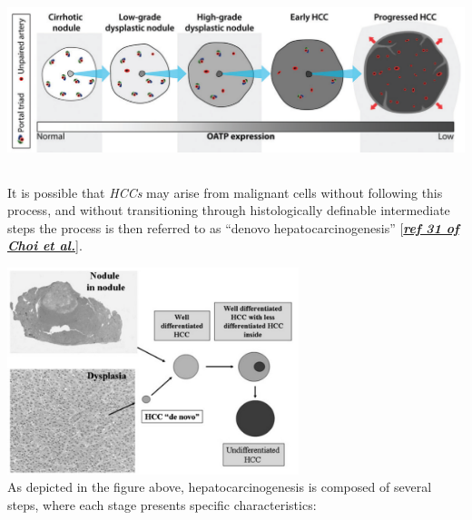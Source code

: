 \documentclass[]{article}
\begin{document}
\includegraphics[width=6.26772in,height=2.00000in]{./images/media/image4.png}

It is possible that \emph{HCCs} may arise from malignant cells without
following this process, and without transitioning through histologically
definable intermediate steps the process is then referred to as ``denovo
hepatocarcinogenesis''
{[}\href{https://docs.google.com/document/d/1F5IUt9O-m_2LUTsJQI_7g8W_0PEHzx9hDfyjPOJ7yvo/edit\#heading=h.tuamaz8z9u81}{\textbf{\emph{ref
31 of Choi et al.}}}{]}.

\includegraphics[width=3.34569in,height=2.37022in]{./images/media/image3.png}\\
As depicted in the figure above, hepatocarcinogenesis is composed of
several steps, where each stage presents specific characteristics:
\end{document}

